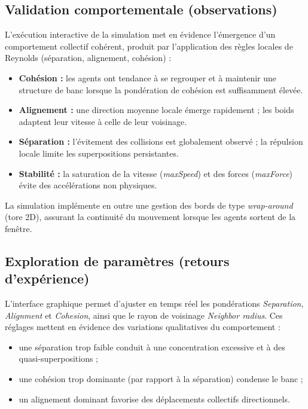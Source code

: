 \documentclass[11pt,a4paper]{article}
\begin{document}
\subsection{Validation comportementale (observations)}
L'exécution interactive de la simulation met en évidence l'émergence d'un comportement collectif cohérent, produit par l'application des règles locales de Reynolds (séparation, alignement, cohésion) :
\begin{itemize}
    \item \textbf{Cohésion :} les agents ont tendance à se regrouper et à maintenir une structure de banc lorsque la pondération de cohésion est suffisamment élevée.
    \item \textbf{Alignement :} une direction moyenne locale émerge rapidement ; les boids adaptent leur vitesse à celle de leur voisinage.
    \item \textbf{Séparation :} l'évitement des collisions est globalement observé ; la répulsion locale limite les superpositions persistantes.
    \item \textbf{Stabilité :} la saturation de la vitesse (\textit{maxSpeed}) et des forces (\textit{maxForce}) évite des accélérations non physiques.
\end{itemize}
La simulation implémente en outre une gestion des bords de type \textit{wrap-around} (tore 2D), assurant la continuité du mouvement lorsque les agents sortent de la fenêtre.

\subsection{Exploration de paramètres (retours d'expérience)}
L'interface graphique permet d'ajuster en temps réel les pondérations \textit{Separation}, \textit{Alignment} et \textit{Cohesion}, ainsi que le rayon de voisinage \textit{Neighbor radius}. Ces réglages mettent en évidence des variations qualitatives du comportement :
\begin{itemize}
    \item une séparation trop faible conduit à une concentration excessive et à des quasi-superpositions ;
    \item une cohésion trop dominante (par rapport à la séparation) condense le banc ;
    \item un alignement dominant favorise des déplacements collectifs directionnels.
\end{itemize}
\end{document}
